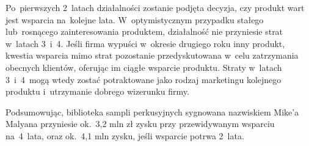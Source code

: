\documentclass[12pt]{article}
\begin{document}
Po~pierwszych 2~latach działalności zostanie podjęta decyzja, czy produkt wart jest wsparcia na~kolejne lata.
W~optymistycznym przypadku stałego lub~rosnącego zainteresowania produktem, działalność nie przyniesie strat w~latach 3~i~4.
Jeśli firma wypuści w~okresie drugiego roku inny produkt, kwestia wsparcia mimo strat pozostanie przedyskutowana w~celu zatrzymania obecnych klientów, oferując im ciągłe wsparcie produktu.
Straty w~latach 3~i~4~mogą wtedy zostać potraktowane jako rodzaj marketingu kolejnego produktu i~utrzymanie dobrego wizerunku firmy.

Podsumowując, biblioteka sampli perkusyjnych sygnowana nazwiskiem Mike'a Malyana przyniesie ok.~3,2 mln zł zysku przy przewidywanym wsparciu na~4~lata, oraz ok.~4,1 mln zysku, jeśli wsparcie potrwa 2~lata.


\begin{table}[h!]
 \begin{center}
 \caption{Jednorazowe wydatki na~wytworzenie produktu}
 \label{table:jednorazowe}
 \end{center}
\end{table}
\end{document}
